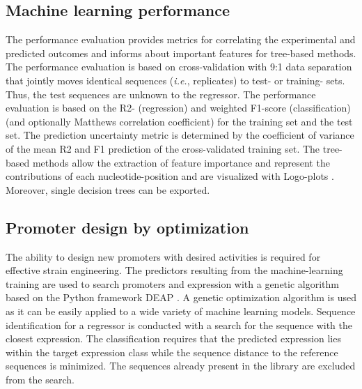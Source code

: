 \documentclass[utf8]{frontiersSCNS} %
\begin{document}
\subsection{Machine learning performance}
The performance evaluation provides metrics for correlating the experimental and predicted outcomes and informs about important features for tree-based methods. The performance evaluation is based on cross-validation with 9:1 data separation that jointly moves identical sequences (\textit{i.e.}, replicates) to test- or training- sets. Thus, the test sequences are unknown to the regressor. The performance evaluation is based on the R2- (regression) and weighted F1-score (classification) (and optionally Matthews correlation coefficient) for the training set and the test set. The prediction uncertainty metric is determined by the coefficient of variance of the mean R2 and F1 prediction of the cross-validated training set. The tree-based methods allow the extraction of feature importance and represent the contributions of each nucleotide-position and are visualized with Logo-plots \citep{Tareen2019}. Moreover, single decision trees can be exported.

\subsection{Promoter design by optimization}
The ability to design new promoters with desired activities is required for effective strain engineering. The predictors resulting from the machine-learning training are used to search promoters and expression with a genetic algorithm based on the Python framework DEAP \citep{Fortin2012}. A genetic optimization algorithm is used as it can be easily applied to a wide variety of machine learning models. %
Sequence identification for a regressor is conducted with a search for the sequence with the closest expression. The classification requires that the predicted expression lies within the target expression class while the sequence distance to the reference sequences is minimized. The sequences already present in the library are excluded from the search. 
\end{document}
